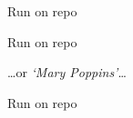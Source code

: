 

\begin{frame}{Run on repo}

\begin{figure}
\begin{center}


\end{center}
\end{figure}

\end{frame}



\begin{frame}{Run on repo}

\ldots or \emph{`Mary Poppins'}\ldots

\end{frame}



\begin{frame}{Run on repo}

\begin{figure}
\begin{center}


\end{center}
\end{figure}

\end{frame}


